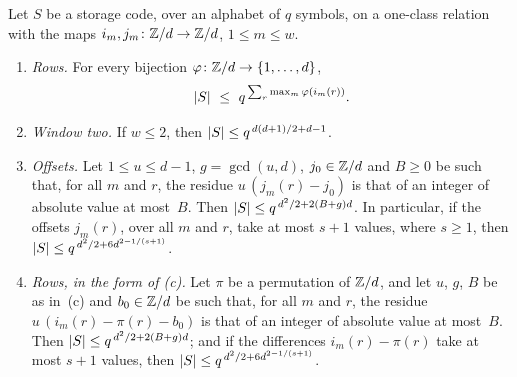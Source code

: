 \begin{proposition}\label{prop:order}
\notformalized
Let $S$ be a storage code, over an alphabet of $q$ symbols, on a one-class relation with the maps
$i_m,j_m\colon\mathbb{Z}/d\to\mathbb{Z}/d$, $1\le m\le w$.
\begin{enumerate}[label=(\alph*),leftmargin=2em]
\item \emph{Rows.} For every bijection $\varphi\colon\mathbb{Z}/d\to\{1,\dots,d\}$,
\[
  \lvert S \rvert\ \le\ q^{\,\sum_r\max_m\varphi(i_m(r))} .
\]
\item \emph{Window two.} If $w\le2$, then $\lvert S \rvert\le q^{\,d(d+1)/2+d-1}$.
\item \emph{Offsets.} Let $1\le u\le d-1$, $g=\gcd(u,d)$, $j_0\in\mathbb{Z}/d$ and $B\ge0$ be such that, for all $m$ and $r$,
the residue $u\,(j_m(r)-j_0)$ is that of an integer of absolute value at most~$B$. Then
$\lvert S \rvert\le q^{\,d^2/2+2(B+g)d}$. In particular, if the offsets $j_m(r)$, over all $m$ and $r$, take at most $s+1$
values, where $s\ge1$, then $\lvert S \rvert\le q^{\,d^2/2+6d^{2-1/(s+1)}}$.
\item \emph{Rows, in the form of (c).} Let $\pi$ be a permutation of $\mathbb{Z}/d$, and let $u$, $g$, $B$ be as in~(c) and
$b_0\in\mathbb{Z}/d$ be such that, for all $m$ and $r$, the residue $u\,(i_m(r)-\pi(r)-b_0)$ is that of an integer of absolute
value at most~$B$. Then $\lvert S \rvert\le q^{\,d^2/2+2(B+g)d}$; and if the differences $i_m(r)-\pi(r)$ take at most $s+1$
values, then $\lvert S \rvert\le q^{\,d^2/2+6d^{2-1/(s+1)}}$.
\end{enumerate}
\end{proposition}

